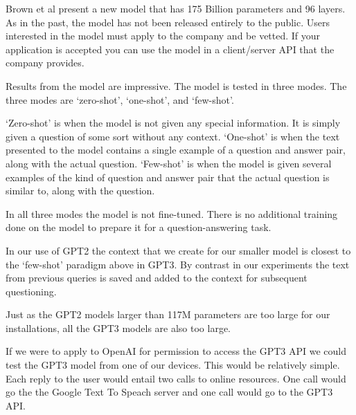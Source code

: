 Brown et al \cite{brown2020language} present a new model that has 175 Billion parameters and 96 layers. As in the past, the model has not been released entirely to the public. Users interested in the model must apply to the company and be vetted. If your application is accepted you can use the model in a client/server API that the company provides.

Results from the model are impressive. The model is tested in three modes. The three modes are `zero-shot', `one-shot', and `few-shot'. 

`Zero-shot' is when the model is not given any special information. It is simply given a question of some sort without any context. `One-shot' is when the text presented to the model contains a single example of a question and answer pair, along with the actual question. `Few-shot' is when the model is given several examples of the kind of question and answer pair that the actual question is similar to, along with the question.

In all three modes the model is not fine-tuned. There is no additional training done on the model to prepare it for a question-answering task.

In our use of GPT2 the context that we create for our smaller model is closest to the `few-shot' paradigm above in GPT3. By contrast in our experiments the text from previous queries is saved and added to the context for subsequent questioning.

Just as the GPT2 models larger than 117M parameters are too large for our installations, all the GPT3 models are also too large. 

If we were to apply to OpenAI for permission to access the GPT3 API we could test the GPT3 model from one of our devices. This would be relatively simple. Each reply to the user would entail two calls to online resources. One call would go the the Google Text To Speach server and one call would go to the GPT3 API.